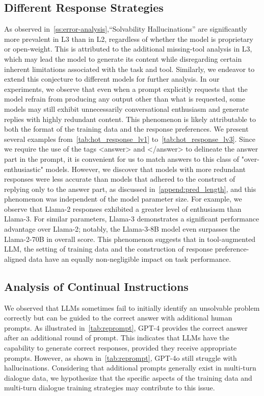 \documentclass[11pt]{article}
\begin{document}
\subsection{Different Response Strategies}
\label{append:ss:strategy}

As observed in~\cref{ss:error-analysis},``Solvability Hallucinations'' are significantly more prevalent in L3 than in L2, regardless of whether the model is proprietary or open-weight. 
This is attributed to the additional missing-tool analysis in L3, which may lead the model to generate its content while disregarding certain inherent limitations associated with the task and tool.
Similarly, we endeavor to extend this conjecture to different models for further analysis.
In our experiments, we observe that even when a prompt explicitly requests that the model refrain from producing any output other than what is requested, some models may still exhibit unnecessarily conversational enthusiasm and generate replies with highly redundant content. 
This phenomenon is likely attributable to both the format of the training data and the response preferences. 
We present several examples from~\cref{tab:hot_response_lv1} to~\cref{tab:hot_response_lv3}.
Since we require the use of the tags <answer> and </answer> to delineate the answer part in the prompt, it is convenient for us to match answers to this class of "over-enthusiastic" models.
However, we discover that models with more redundant responses were less accurate than models that adhered to the construct of replying only to the answer part, as discussed in~\cref{append:pred_length}, and this phenomenon was independent of the model parameter size.
For example, we observe that Llama-2 responses exhibited a greater level of enthusiasm than Llama-3. 
For similar parameters, Llama-3 demonstrates a significant performance advantage over Llama-2; notably, the Llama-3-8B model even surpasses the Llama-2-70B in overall score.
This phenomenon suggests that in tool-augmented LLM, the setting of training data and the construction of response preference-aligned data have an equally non-negligible impact on task performance.


\subsection{Analysis of Continual Instructions}
\label{append:ss:reprompt}

We observed that LLMs sometimes fail to initially identify an unsolvable problem correctly but can be guided to the correct answer with additional human prompts. 
As illustrated in~\cref{tab:reprompt}, GPT-4 provides the correct answer after an additional round of prompt.
This indicates that LLMs have the capability to generate correct responses, provided they receive appropriate prompts.
However, as shown in~\cref{tab:reprompt}, GPT-4o still struggle with hallucinations.
Considering that additional prompts generally exist in multi-turn dialogue data, we hypothesize that the specific aspects of the training data and multi-turn dialogue training strategies may contribute to this issue.
\end{document}

